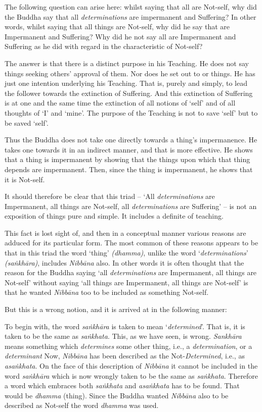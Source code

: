 The following question can arise here: whilst saying that all  are Not-self, why did the Buddha say that all \emph{determinations} are impermanent and Suffering? In other words, whilst saying that all things are Not-self, why did he say that  are Impermanent and Suffering? Why did he not  say all  are Impermanent and Suffering as he did with regard in the characteristic of Not-self?

The answer is that there is a distinct purpose in his Teaching. He does not say things seeking others' approval of them. Nor does he set out to  or  things. He has just one intention underlying his Teaching. That is, purely and simply, to lead the follower towards the extinction of Suffering. And this extinction of Suffering is at one and the same time the extinction of all notions of `self' and of all thoughts of `I' and `mine'. The purpose of the Teaching is not to save `self' but to be saved  `self'.

Thus the Buddha does not take one directly towards a thing's impermanence. He takes one towards it in an indirect manner, and that is more effective. He shows that a thing is impermanent by showing that the things upon which that thing depends are impermanent. Then, since the thing is impermanent, he shows that it is Not-self.

It should therefore be clear that this triad -- `All \emph{determinations} are Impermanent, all things are Not-self, all \emph{determinations} are Suffering' -- is not an exposition of things pure and simple. It includes a definite  of teaching.

This fact is lost sight of, and then in a conceptual manner various reasons are adduced for its particular form. The most common of these reasons appears to be that in this triad the word `thing' \emph{(dhamma)}, unlike the word `\emph{determinations}' \emph{(saṅkhāra)}, includes \emph{Nibbāna} also. In other words it is often thought that the reason for the Buddha saying `all \emph{determinations} are Impermanent, all things are Not-self' without saying `all things are Impermanent, all things are Not-self' is that he wanted \emph{Nibbāna} too to be included as something Not-self.

But this is a wrong notion, and it is arrived at in the following manner:

To begin with, the word \emph{saṅkhāra} is taken to mean `\emph{determined}'. That is, it is taken to be the same as \emph{saṅkhata}. This, as we have seen, is wrong. \emph{Sankhāra} means something which \emph{determines} some other thing, i.e., a \emph{determination}, or a \emph{determinant} Now, \emph{Nibbāna} has been described as the Not-\emph{Determined}, i.e., as \emph{asaṅkhata}. On the face of this description of \emph{Nibbāna} it cannot be included in the word \emph{saṅkhāra} which is now wrongly taken to be the same as \emph{saṅkhata}. Therefore a word which embraces both \emph{saṅkhata} and \emph{asaṅkhata} has to be found. That would be \emph{dhamma} (thing). Since the Buddha wanted \emph{Nibbāna} also to be described as Not-self the word \emph{dhamma} was used.

